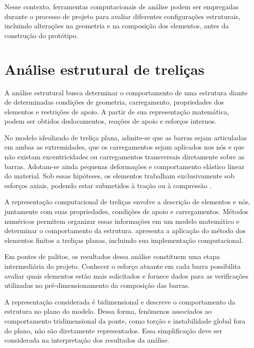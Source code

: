 Nesse contexto, ferramentas computacionais de análise podem ser empregadas durante o processo de projeto para avaliar diferentes configurações estruturais, incluindo alterações na geometria e na composição dos elementos, antes da construção do protótipo.

\section{Análise estrutural de treliças}
\label{sec:analise-estrutural-trelicas}

A análise estrutural busca determinar o comportamento de uma estrutura diante de determinadas condições de geometria, carregamento, propriedades dos elementos e restrições de apoio. A partir de sua representação matemática, podem ser obtidos deslocamentos, reações de apoio e esforços internos.

No modelo idealizado de treliça plana, admite-se que as barras sejam articuladas em ambas as extremidades, que os carregamentos sejam aplicados nos nós e que não existam excentricidades ou carregamentos transversais diretamente sobre as barras. Adotam-se ainda pequenas deformações e comportamento elástico linear do material. Sob essas hipóteses, os elementos trabalham exclusivamente sob esforços axiais, podendo estar submetidos à tração ou à compressão \cite{souza2024elementosfinitos}.

A representação computacional de treliças envolve a descrição de elementos e nós, juntamente com suas propriedades, condições de apoio e carregamentos. Métodos numéricos permitem organizar essas informações em um modelo matemático e determinar o comportamento da estrutura.  apresenta a aplicação do método dos elementos finitos a treliças planas, incluindo sua implementação computacional.

Em pontes de palitos, os resultados dessa análise constituem uma etapa intermediária do projeto. Conhecer o esforço atuante em cada barra possibilita avaliar quais elementos estão mais solicitados e fornece dados para as verificações utilizadas no pré-dimensionamento da composição das barras.

A representação considerada é bidimensional e descreve o comportamento da estrutura no plano do modelo. Dessa forma, fenômenos associados ao comportamento tridimensional da ponte, como torção e instabilidade global fora do plano, não são diretamente representados. Essa simplificação deve ser considerada na interpretação dos resultados da análise.

